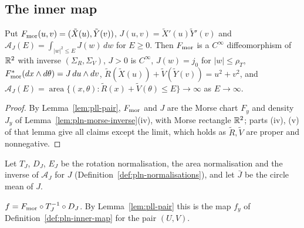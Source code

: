 \subsection{The inner map}\label{sec:pll-inner-map}

\begin{lemma}\label{lem:pll-morse-density}
Put $F_{\rm mor}(u,v)=(\tilde X(u),\tilde Y(v))$, $J(u,v)=\tilde X'(u)\tilde Y'(v)$ and
$\mathcal A_J(E)=\int_{|w|^2\le E}J(w)\,dw$ for $E\ge0$. Then $F_{\rm mor}$ is a $C^\infty$ diffeomorphism of $\mathbb{R}^2$
with inverse $(\Sigma_R,\Sigma_V)$, $J>0$ is $C^\infty$, $J(w)=j_0$ for $|w|\le\rho_T$,
$F_{\rm mor}^*(dx\wedge d\theta)=J\,du\wedge dv$, $\tilde R(\tilde X(u))+\tilde V(\tilde Y(v))=u^2+v^2$, and
$\mathcal A_J(E)=\operatorname{area}\{(x,\theta):\tilde R(x)+\tilde V(\theta)\le E\}\to\infty$ as $E\to\infty$.
\end{lemma}

\begin{proof}
By Lemma~\ref{lem:pll-pair}, $F_{\rm mor}$ and $J$ are the Morse chart $F_y$ and density $J_y$ of Lemma~\ref{lem:pln-morse-inverse}(iv), with Morse rectangle $\mathbb{R}^2$; parts (iv), (v) of that lemma give all claims except the limit, which holds as $\tilde R,\tilde V$ are proper and nonnegative.
\end{proof}

Let $T_J$, $D_J$, $E_J$ be the rotation normalisation, the area normalisation and the inverse of $\mathcal A_J$ for $J$ (Definition~\ref{def:pln-normalisations}), and let $\bar J$ be the circle mean of $J$.

\begin{definition}\label{def:pll-inner-map}
$f=F_{\rm mor}\circ T_J^{-1}\circ D_J$. By Lemma~\ref{lem:pll-pair} this is the map $f_y$ of
Definition~\ref{def:pln-inner-map} for the pair $(U,V)$.
\end{definition}

